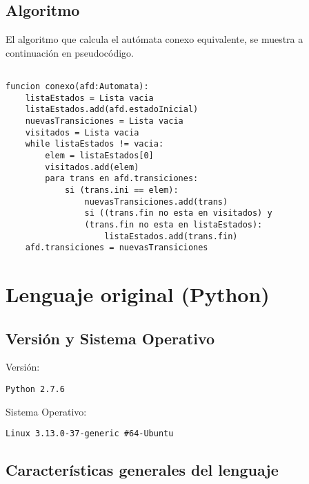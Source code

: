 \documentclass[12pt,a4paper]{article}
\begin{document}
\subsection{Algoritmo}
El algoritmo que calcula el autómata conexo equivalente, se muestra a 
continuación en pseudocódigo.
\begin{lstlisting}

funcion conexo(afd:Automata):
	listaEstados = Lista vacia
	listaEstados.add(afd.estadoInicial)
	nuevasTransiciones = Lista vacia
	visitados = Lista vacia
	while listaEstados != vacia:
		elem = listaEstados[0]
		visitados.add(elem)
		para trans en afd.transiciones:
			si (trans.ini == elem):
				nuevasTransiciones.add(trans)
				si ((trans.fin no esta en visitados) y
				(trans.fin no esta en listaEstados):
					listaEstados.add(trans.fin)
	afd.transiciones = nuevasTransiciones

\end{lstlisting}


\section{Lenguaje original (Python)}

\subsection{Versión y Sistema Operativo}
Versión:
\begin{lstlisting}
Python 2.7.6 
\end{lstlisting}
Sistema Operativo: 
\begin{lstlisting}
Linux 3.13.0-37-generic #64-Ubuntu
\end{lstlisting}

\subsection{Características generales del lenguaje}
\end{document}
